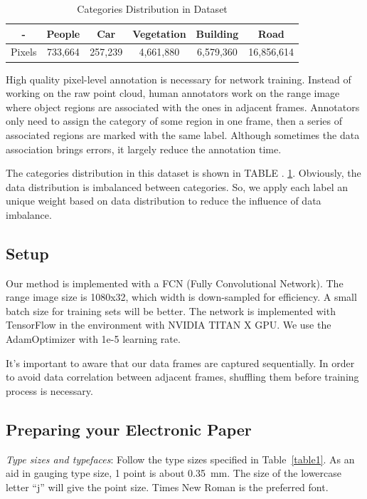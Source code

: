 \begin{table}[hb]
	\begin{center} \caption{Categories Distribution in Dataset}
		\label{category_distribution}
		\renewcommand{\arraystretch}{1.3}
		\begin{tabular}{|c|c|c|c|c|c|}
			\hline
			 - & People & Car & Vegetation & Building & Road	\\
			\hline
			Pixels & 733,664 & 257,239 & 4,661,880 & 6,579,360 & 16,856,614	\\
			\hline
		\end{tabular}
	\end{center}
\end{table}

High quality pixel-level annotation is necessary for network training. Instead of working on the raw point cloud, human annotators work on the range image where object regions are associated with the ones in adjacent frames. Annotators only need to assign the category of some region in one frame, then a series of associated regions are marked with the same label. Although sometimes the data association brings errors, it largely reduce the annotation time. 

The categories distribution in this dataset is shown in TABLE . \ref{category_distribution}. Obviously, the data distribution is imbalanced between categories. So, we apply each label an unique weight based on data distribution to reduce the influence of data imbalance.

\subsection{Setup}
Our method is implemented with a FCN (Fully Convolutional Network). The range image size is 1080x32, which width is down-sampled for efficiency. A small batch size for training sets will be better. The network is implemented with TensorFlow in the environment with NVIDIA TITAN X GPU. We use the AdamOptimizer with 1e-5 learning rate.

It's important to aware that our data frames are captured sequentially. In order to avoid data correlation between adjacent frames, shuffling them before training process is necessary.

\subsection{Preparing your Electronic Paper}

{\em Type sizes and typefaces}: Follow the type sizes specified in
Table~\ref{table1}. As an aid in gauging type size, 1 point is
about 0.35~mm. The size of the lowercase letter ``j'' will give
the point size. Times New Roman is the preferred font.

